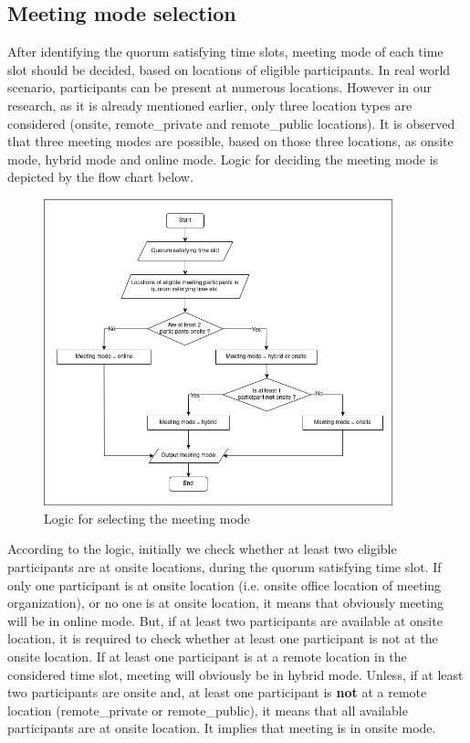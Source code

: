 \subsection{Meeting mode selection}\label{sec:logic_for_selecting_the_meeting_mode}
After identifying the quorum satisfying time slots, meeting mode of each time slot should be decided, based on locations of eligible participants. In real world scenario, participants can be present at numerous locations. However in our research, as it is already mentioned earlier, only three location types are considered (onsite, remote\_private and remote\_public locations). It is observed that three meeting modes are possible, based on those three locations, as onsite mode, hybrid mode and online mode. Logic for deciding the meeting mode is depicted by the flow chart below.
\begin{figure}[H]
    \centering
    \includegraphics[width=0.9\textwidth]{./image/meeting_mode_selection.png}
    \caption{Logic for selecting the meeting mode}
    \label{fig:logic for selecting the meeting mode}
\end{figure} 
According to the logic, initially we check whether at least two eligible participants are at onsite locations, during the quorum satisfying time slot. If only one participant is at onsite location (i.e. onsite office location of meeting organization), or no one is at onsite location, it means that obviously meeting will be in online mode. But, if at least two participants are available at onsite location, it is required to check whether at least one participant is not at the onsite location. If at least one participant is at a remote location in the considered time slot, meeting will obviously be in hybrid mode. Unless, if at least two participants are onsite and, at least one participant is \textbf{not} at a remote location (remote\_private or remote\_public), it means that all available participants are at onsite location. It implies that meeting is in onsite mode.\\ \\
